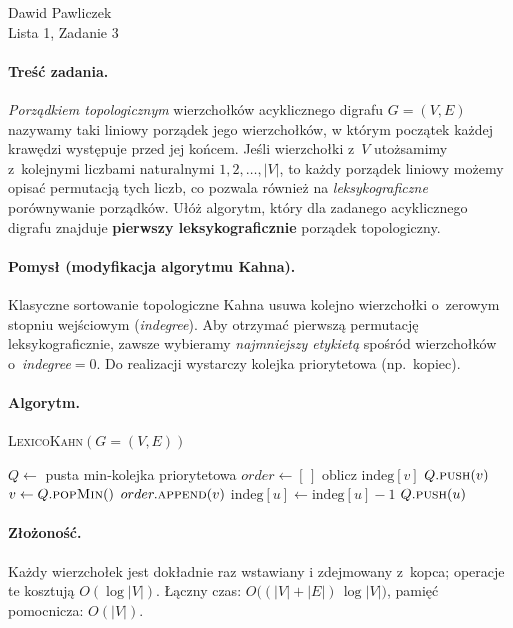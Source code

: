 \documentclass[11pt,a4paper]{article}
\begin{document}
\begin{center}
\Large Dawid Pawliczek\\
Lista 1, Zadanie 3
\end{center}

\bigskip

\paragraph{Treść zadania.}
\emph{Porządkiem topologicznym} wierzchołków acyklicznego digrafu
$G=(V,E)$ nazywamy taki liniowy porządek jego wierzchołków, w którym
początek każdej krawędzi występuje przed jej końcem.
Jeśli wierzchołki z~$V$ utożsamimy z~kolejnymi liczbami naturalnymi
$1,2,\dots,|V|$, to każdy porządek liniowy możemy opisać
permutacją tych liczb, co pozwala również na \emph{leksykograficzne}
porównywanie porządków.
Ułóż algorytm, który dla zadanego acyklicznego digrafu
znajduje \textbf{pierwszy leksykograficznie} porządek topologiczny.

\bigskip
\paragraph{Pomysł (modyfikacja algorytmu Kahna).}
Klasyczne sortowanie topologiczne Kahna usuwa kolejno
wierzchołki o~zerowym stopniu wejściowym (\textit{indegree}).
Aby otrzymać pierwszą permutację leksykograficznie,
zawsze wybieramy \emph{najmniejszy etykietą} spośród wierzchołków
o~\textit{indegree}\;$=0$.
Do realizacji wystarczy kolejka priorytetowa (np.\ kopiec).

\bigskip
\paragraph{Algorytm.}

\begin{algorithm}[H]
\caption{\textsc{LexicoKahn}$(G=(V,E))$}
\begin{algorithmic}[1]
\State $Q\gets$ pusta min‐kolejka priorytetowa
\State $order\gets[\,]$ 
  \State oblicz $\text{indeg}[v]$
     \State $Q.\textsc{push}(v)$
  \Fi
\EndFor
{}
  \State $v\gets Q.\textsc{popMin}()$ 
  \State $order.\textsc{append}(v)$
     \State $\text{indeg}[u]\gets\text{indeg}[u]-1$
        \State $Q.\textsc{push}(u)$
     \Fi
  \EndFor
\EndWhile
\State {}
\end{algorithmic}
\end{algorithm}

\paragraph{Złożoność.}
Każdy wierzchołek jest dokładnie raz wstawiany i zdejmowany
z~kopca; operacje te kosztują $O(\log |V|)$.
Łączny czas: $O\bigl((|V|+|E|)\,\log |V|\bigr)$,
pamięć pomocnicza: $O(|V|)$.
\end{document}
